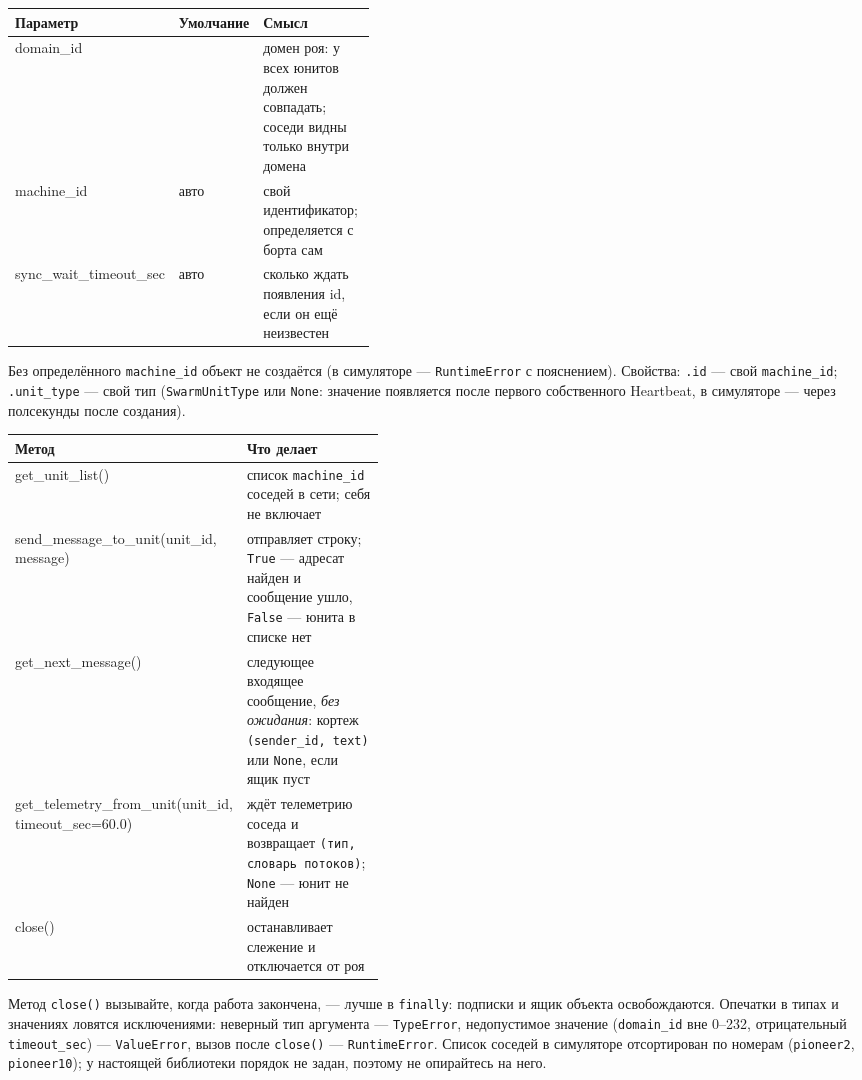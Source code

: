 \begin{center}
\small
\begin{tabularx}{\linewidth}{@{}>{\ttfamily\raggedright\arraybackslash}p{0.27\linewidth} >{\raggedright\arraybackslash}p{0.15\linewidth} X@{}}
\toprule
\textrm{\textbf{Параметр}} & \textrm{\textbf{Умолчание}} & \textrm{\textbf{Смысл}} \\
\midrule
domain\_id & 0 & домен роя: у всех юнитов должен совпадать; соседи видны только внутри домена \\
machine\_id & авто & свой идентификатор; определяется с борта сам \\
sync\_wait\_timeout\_sec & авто & сколько ждать появления id, если он ещё неизвестен \\
\bottomrule
\end{tabularx}
\end{center}

Без определённого \texttt{machine\_id} объект не создаётся (в симуляторе --- \verb|RuntimeError| с пояснением). Свойства: \verb|.id| --- свой \texttt{machine\_id}; \verb|.unit_type| --- свой тип (\verb|SwarmUnitType| или \verb|None|: значение появляется после первого собственного Heartbeat, в симуляторе --- через полсекунды после создания).

\begin{center}
\small
\begin{tabularx}{\linewidth}{@{}>{\ttfamily\raggedright\arraybackslash}p{0.43\linewidth} X@{}}
\toprule
\textrm{\textbf{Метод}} & \textrm{\textbf{Что делает}} \\
\midrule
get\_unit\_list() & список \texttt{machine\_id} соседей в сети; себя не включает \\
send\_message\_to\_unit(unit\_id, message) & отправляет строку; \verb|True| --- адресат найден и сообщение ушло, \verb|False| --- юнита в списке нет \\
get\_next\_message() & следующее входящее сообщение, \emph{без ожидания}: кортеж \verb|(sender_id, text)| или \verb|None|, если ящик пуст \\
get\_telemetry\_from\_unit(unit\_id, timeout\_sec=60.0) & ждёт телеметрию соседа и возвращает \verb|(тип, словарь потоков)|; \verb|None| --- юнит не найден \\
close() & останавливает слежение и отключается от роя \\
\bottomrule
\end{tabularx}
\end{center}

Метод \verb|close()| вызывайте, когда работа закончена, --- лучше в \verb|finally|: подписки и ящик объекта освобождаются. Опечатки в типах и значениях ловятся исключениями: неверный тип аргумента --- \verb|TypeError|, недопустимое значение (\verb|domain_id| вне 0--232, отрицательный \verb|timeout_sec|) --- \verb|ValueError|, вызов после \verb|close()| --- \verb|RuntimeError|. Список соседей в симуляторе отсортирован по номерам (\texttt{pioneer2}, \texttt{pioneer10}); у настоящей библиотеки порядок не задан, поэтому не опирайтесь на него.

